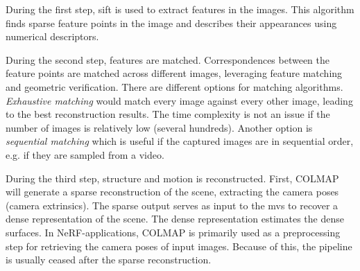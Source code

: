 During the first step, \acrfull{sift} \cite{lowe_distinctive_2004} is used to extract features in the images. This algorithm finds sparse feature points in the image and describes their appearances using numerical descriptors.


During the second step, features are matched. Correspondences between the feature points are matched across different images, leveraging feature matching and geometric verification. There are different options for matching algorithms. \textit{Exhaustive matching} would match every image against every other image, leading to the best reconstruction results. The time complexity is not an issue if the number of images is relatively low (several hundreds). Another option is \textit{sequential matching} which is useful if the captured images are in sequential order, e.g. if they are sampled from a video.

During the third step, structure and motion is reconstructed. First, COLMAP will generate a sparse reconstruction of the scene, extracting the camera poses (camera extrinsics). The sparse output serves as input to the \acrfull{mvs} to recover a dense representation of the scene. The dense representation estimates the dense surfaces. In NeRF-applications, COLMAP is primarily used as a preprocessing step for retrieving the camera poses of input images. Because of this, the pipeline is usually ceased after the sparse reconstruction.



\begin{comment}
Exhaustive matching:
time complexity: O(n^2), where n is the number of images
memory complexity: O(n) for storing all images, O(n^2) for storing the results of the matching process

Sequential matching:
time complexity: O(n * k), where n is the number of images and k is the number of adjacent images each image is matched against
memory complexity: O(n * k)

Vocabulary tree-based matching:
time complexity: O(n^2), assuming that the size of the vocabulary tree is constant and not a function of the number n of images
memory complexity: O(n * k), where k is the number of top-retrieved images that each image is matched against
There is definitively literature on the topic of the time and memory complexity of vocabulary tree-based matching and image retrieval
\end{comment}

